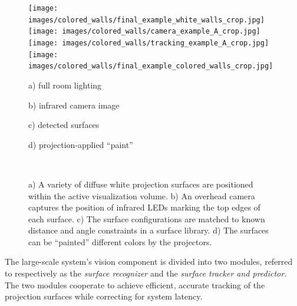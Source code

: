 \documentclass{thesis}
\begin{document}
\begin{figure}[t]
\texttt{[image: images/colored\_walls/final\_example\_white\_walls\_crop.jpg]}
\texttt{[image: images/colored\_walls/camera\_example\_A\_crop.jpg]}
\texttt{[image: images/colored\_walls/tracking\_example\_A\_crop.jpg]}
\texttt{[image: images/colored\_walls/final\_example\_colored\_walls\_crop.jpg]}
\vspace{0.1in}\\
\begin{minipage}{0.27\textwidth}\vspace{-0.25in} \begin{center}\scriptsize{a) full room lighting} \end{center}\end{minipage}%
\begin{minipage}{0.216\textwidth}\vspace{-0.25in} \begin{center}\scriptsize{b) infrared camera image} \end{center}\end{minipage}%
\begin{minipage}{0.216\textwidth}\vspace{-0.25in} \begin{center}\scriptsize{c) detected surfaces} \end{center}\end{minipage}%
\begin{minipage}{0.27\textwidth}\vspace{-0.25in} \begin{center}\scriptsize{d) projection-applied ``paint''} \end{center}\end{minipage}%
\vspace{-0.25in}\\
\caption[Surface Recognition and Tracking]{ a) A variety of diffuse  white projection surfaces are positioned within the active visualization volume.  b) An overhead camera captures the position of infrared LEDs marking the top edges of each surface.  c) The surface configurations are matched to known distance and angle constraints in a surface library.  d) The surfaces can be ``painted'' different colors by the projectors.
\vspace{-0.05in}
}
\label{FIGURE:colored_walls_and_tracking}
\end{figure}


The large-scale system's vision component is divided into two modules, referred to respectively as the {\em surface recognizer} and the {\em surface tracker and predictor.} The two modules cooperate to achieve efficient, accurate tracking of the projection surfaces while correcting for system latency.
\end{document}
